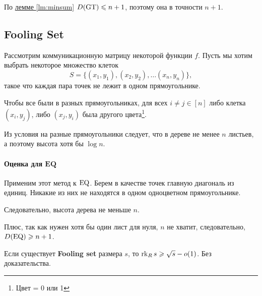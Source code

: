 По \hyperref[lm:minsum]{лемме \ref{lm:minsum}} $ D(\operatorname{GT}) \leqslant n+1$, поэтому она в точности $ n+1$.


\subsection{Fooling Set}
Рассмотрим коммуникационную матрицу некоторой функции $ f$. Пусть мы хотим выбрать некоторое множество клеток 
\[
	S = \{(x_1, y_1), (x_2, y_2) , \ldots (x_{n}, y_{n})\}
,\] 
такое что каждая пара точек не лежит в одном прямоугольнике.

Чтобы все были в разных прямоугольниках, для всех $ i \ne j \in [n]$ либо клетка $ (x_i, y_j)$, либо  $ (x_j, y_i)$ была  другого цвета\footnote{Цвет = 0 или 1}.

Из условия  на разные прямоугольники следует, что в дереве не менее $ n$ листьев, а поэтому высота хотя бы  $  \log n$.

\paragraph{Оценка для $\mathbf{EQ}$}
Применим этот метод к $ \operatorname{EQ}$. Берем в качестве точек главную диагональ из единиц. Никакие из них не находятся в одном одноцветном прямоугольнике. 

Следовательно, высота дерева не меньше $ n$.

Плюс, так как нужен хотя бы один лист для нуля, $ n$ не хватит, следовательно,  $ D(\operatorname{EQ}) \geqslant n+1$.

\begin{thm}
	Если существует \textbf{Fooling set} размера $ s$, то $ \operatorname{rk}_R s \geqslant \sqrt{ s} - o(1) $.
	Без доказательства.
\end{thm}


